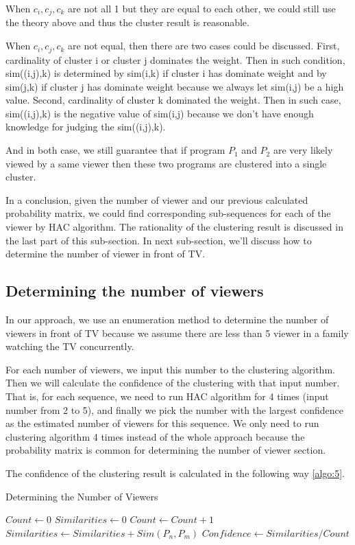 When $c_i,c_j,c_k$ are not all 1 but they are equal to each other, we could still use the theory above and thus the cluster result
is reasonable.

When $c_i,c_j,c_k$ are not equal, then there are two cases could be discussed. First, cardinality of cluster i or cluster j dominates
the weight. Then in such condition, sim((i,j),k) is determined by sim(i,k) if cluster i has dominate weight and by sim(j,k) if cluster
j has dominate weight because we always let sim(i,j) be a high value. Second, cardinality of cluster k dominated the weight. Then in
such case, sim((i,j),k) is the negative value of sim(i,j) because we don't have enough knowledge for judging the sim((i,j),k).

And in both case, we still guarantee that if program $P_1$ and $P_2$ are very likely viewed by a same viewer then these two programs are
clustered into a single cluster.

In a conclusion, given the number of viewer and our previous calculated probability matrix, we could find corresponding sub-sequences for
each of the viewer by HAC algorithm. The rationality of the clustering result is discussed in the last part of this sub-section. In next
sub-section, we'll discuss how to determine the number of viewer in front of TV.

\subsection{Determining the number of viewers}
In our approach, we use an enumeration method to determine the number of viewers in front of TV because we assume there are less than 5
viewer in a family watching the TV concurrently.

For each number of viewers, we input this number to the clustering algorithm. Then we will calculate the confidence of the clustering
with that input number. That is, for each sequence, we need to run HAC algorithm for 4 times (input number from 2 to 5), and finally we pick 
the number with the largest confidence as the estimated number of viewers for this sequence. We only need to run clustering algorithm 4 
times instead of the whole approach because the probability matrix is common for determining the number of viewer section.

The confidence of the clustering result is calculated in the following way \ref{algo:5}.
\begin{algorithm}[htb]
\caption{Determining the Number of Viewers}
\label{algo:5}
\begin{algorithmic}[1]
\STATE $Count \leftarrow 0$
\STATE $Similarities \leftarrow 0$
\STATE $Count \leftarrow Count + 1$
\STATE $Similarities \leftarrow Similarities + Sim(P_n, P_m)$
\ENDFOR
\ENDFOR
\ENDFOR
\STATE $Confidence \leftarrow Similarities / Count$
\end{algorithmic}
\end{algorithm}

